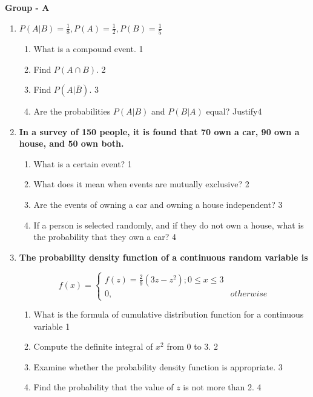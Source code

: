 \documentclass[12pt]{article}
\begin{document}
\begin{center}
\textbf{Group  - A}
\end{center}
 \begin{enumerate}

   \item
  \textbf{$P(A\vert B) = \frac 1 8, P(A) = \frac 12, P(B) = \frac 15$}
 
  \begin{enumerate}
    \item What is a compound event. \hfill 1 
    \item
    	Find $P(A\cap B)$.  \hfill 2
    \item
    	Find $P(A\vert \bar B)$. \hfill 3
     \item
     	Are the probabilities $P(A\vert B)$ and $P(B\vert A)$ equal? Justify\hfill 4
  \end{enumerate}


\item  
  \textbf{In a survey of 150 people, it is found that 70 own a car, 90 own a house, and 50 own both.}  

  \begin{enumerate}  
    \item What is a certain event? \hfill 1
    \item What does it mean when events are mutually exclusive? \hfill 2
    \item  
    	Are the events of owning a car and owning a house independent?  \hfill 3  
    \item  
    	If a person is selected randomly, and if they do not own a house, what is the probability that they own a car? \hfill 4  
  \end{enumerate}  
  
  

   \item
  \textbf{The probability density function of a continuous random variable is}

$$
  f(x) =
\begin{cases}
f(z) = \frac29 (3z-z^2); 0 \le x \le 3 \\
0, & otherwise
\end{cases}
$$
  
  \begin{enumerate}
    \item What is the formula of cumulative distribution function for a continuous variable \hfill 1
    \item Compute the definite integral of \( x^2 \) from 0 to 3. \hfill 2
    \item  
	Examine whether the probability density function is appropriate. \hfill 3
    \item
	Find the probability that the value of $z$ is not more than 2. \hfill 4
  \end{enumerate}
  




\end{enumerate}
\end{document}
